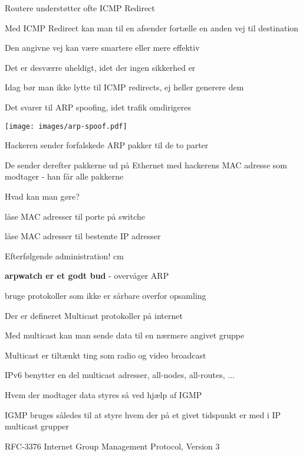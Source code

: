 \begin{list1}
\item Routere understøtter ofte ICMP Redirect
\item Med ICMP Redirect kan man til en afsender fortælle en anden vej til destination
\item Den angivne vej kan være smartere eller mere effektiv
\item Det er desværre uheldigt, idet der ingen sikkerhed er
\item Idag bør man ikke lytte til ICMP redirects, ej heller generere dem
\item Det svarer til ARP spoofing, idet trafik omdirigeres
\end{list1}



\begin{center}
\colorbox{white}{\texttt{[image: images/arp-spoof.pdf]}}  
\end{center}

\begin{list1}
\item Hackeren sender forfalskede ARP pakker til de to parter
\item De sender derefter pakkerne ud på Ethernet med hackerens MAC
  adresse som modtager - han får alle pakkerne
\end{list1}


\begin{list1}
\item Hvad kan man gøre? 
\item låse MAC adresser til porte på switche
\item låse MAC adresser til bestemte IP adresser
\item Efterfølgende administration!
 cm
\item {\bfseries arpwatch er et godt bud} - overvåger ARP
\item bruge protokoller som ikke er sårbare overfor opsamling
\end{list1}



\begin{list1}
\item Der er defineret Multicast protokoller på internet
\item Med multicast kan man sende data til en nærmere angivet gruppe
\item Multicast er tiltænkt ting som radio og video broadcast
\item IPv6 benytter en del multicast adresser, all-nodes, all-routes, ...
\item Hvem der modtager data styres så ved hjælp af IGMP
\item IGMP bruges således til at styre hvem der på et givet tidspunkt er med i IP multicast grupper
\item RFC-3376 Internet Group Management Protocol, Version 3
\item {}
\end{list1}


